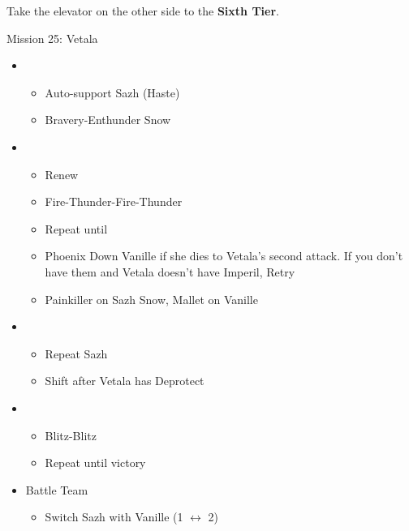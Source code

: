 \documentclass{report}
\begin{document}
Take the elevator on the other side to the \textbf{Sixth Tier}.

\begin{battle}{Mission 25: Vetala}
\begin{itemize}
    \item \first
    \begin{itemize}
        \item Auto-support Sazh (Haste)
        \item Bravery-Enthunder Snow
    \end{itemize}
    \item \fifth
    \begin{itemize}
        \item Renew
        \item Fire-Thunder-Fire-Thunder
        \item Repeat until \stagger
        \item Phoenix Down Vanille if she dies to Vetala's second attack. If you don't have them and Vetala doesn't have Imperil, Retry
        \item Painkiller on Sazh Snow, Mallet on Vanille
    \end{itemize}
    \item \first
    \begin{itemize}
        \item Repeat Sazh
        \item Shift after Vetala has Deprotect
    \end{itemize}
    \item \second
    \begin{itemize}
        \item Blitz-Blitz
        \item Repeat until victory
    \end{itemize}
\end{itemize}
\end{battle}

\begin{menu}
\begin{itemize}
    \paradigm
    \begin{itemize}
        \item {}%
{\paradigmline{\syn}{(\rav)}{(\sen)}}%
{\paradigmline{\textit{\com}}{\textit{(\rav)}}{\textit{(\rav)}}}%
{\paradigmline{(\rav)}{(\rav)}{(\sen)}}%
{\paradigmline{\com}{(\rav)}{\com}}%
{\paradigmline{\rav}{\sab}{(\sen)}}%
{\paradigmline{\com}{\rav}{\com}}
    \end{itemize}
    \item Battle Team
    \begin{itemize}
        \item Switch Sazh with Vanille (1 $\leftrightarrow$ 2)
    \end{itemize}
\end{itemize}
\end{menu}
\end{document}

